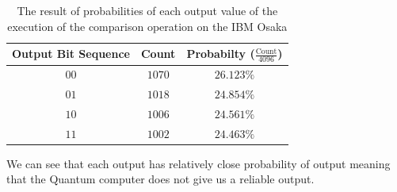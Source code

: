 \begin{table}[!ht]
    \centering
    \begin{tabular}{c|c|c}
        Output Bit Sequence & Count & Probabilty ($\frac{\text{Count}}{4096}$) \\
        \hline
        $00$ & $1070$ & $26.123\%$ \\
        $01$ & $1018$ & $24.854\%$ \\
        $10$ & $1006$ & $24.561\%$ \\
        $11$ & $1002$ & $24.463\%$ \\
    \end{tabular}
    \caption{The result of probabilities of each output value of the execution of the comparison operation on the IBM Osaka}
\end{table}

We can see that each output has relatively close probability of output meaning that the Quantum computer does not give us a reliable output.